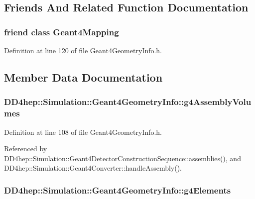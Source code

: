 \subsection{Friends And Related Function Documentation}
\hypertarget{class_d_d4hep_1_1_simulation_1_1_geant4_geometry_info_a1fe4b6e068c20a04fa1a7226219dac7c}{
\subsubsection[{Geant4Mapping}]{\setlength{\rightskip}{0pt plus 5cm}friend class {\bf Geant4Mapping}}}
\label{class_d_d4hep_1_1_simulation_1_1_geant4_geometry_info_a1fe4b6e068c20a04fa1a7226219dac7c}


Definition at line 120 of file Geant4GeometryInfo.h.

\subsection{Member Data Documentation}
\hypertarget{class_d_d4hep_1_1_simulation_1_1_geant4_geometry_info_a663f4e581a601fe42c81bd936c4d6960}{
\subsubsection[{g4AssemblyVolumes}]{ {\bf DD4hep::Simulation::Geant4GeometryInfo::g4AssemblyVolumes}}}
\label{class_d_d4hep_1_1_simulation_1_1_geant4_geometry_info_a663f4e581a601fe42c81bd936c4d6960}


Definition at line 108 of file Geant4GeometryInfo.h.

Referenced by DD4hep::Simulation::Geant4DetectorConstructionSequence::assemblies(), and DD4hep::Simulation::Geant4Converter::handleAssembly().\hypertarget{class_d_d4hep_1_1_simulation_1_1_geant4_geometry_info_a40b8d4041f5b89826971ffb9d1db9e1c}{
\subsubsection[{g4Elements}]{ {\bf DD4hep::Simulation::Geant4GeometryInfo::g4Elements}}}
\label{class_d_d4hep_1_1_simulation_1_1_geant4_geometry_info_a40b8d4041f5b89826971ffb9d1db9e1c}


